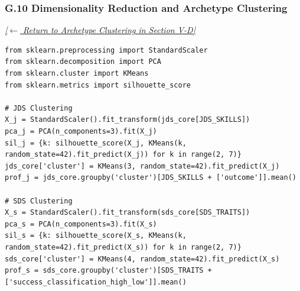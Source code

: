 \documentclass[conference]{IEEEtran}
\begin{document}
\subsubsection*{G.10 Dimensionality Reduction and Archetype Clustering}
\label{lst:clustering}
\textit{\hyperref[sec:multivariate]{[$\leftarrow$ Return to Archetype Clustering in Section V-D]}}

\begin{lstlisting}[style=pythonstyle,caption={PCA loadings, silhouette evaluation across k, and cluster centroid profiling.},label={lst:clustering_code}]
from sklearn.preprocessing import StandardScaler
from sklearn.decomposition import PCA
from sklearn.cluster import KMeans
from sklearn.metrics import silhouette_score

# JDS Clustering
X_j = StandardScaler().fit_transform(jds_core[JDS_SKILLS])
pca_j = PCA(n_components=3).fit(X_j)
sil_j = {k: silhouette_score(X_j, KMeans(k, random_state=42).fit_predict(X_j)) for k in range(2, 7)}
jds_core['cluster'] = KMeans(3, random_state=42).fit_predict(X_j)
prof_j = jds_core.groupby('cluster')[JDS_SKILLS + ['outcome']].mean()

# SDS Clustering
X_s = StandardScaler().fit_transform(sds_core[SDS_TRAITS])
pca_s = PCA(n_components=3).fit(X_s)
sil_s = {k: silhouette_score(X_s, KMeans(k, random_state=42).fit_predict(X_s)) for k in range(2, 7)}
sds_core['cluster'] = KMeans(4, random_state=42).fit_predict(X_s)
prof_s = sds_core.groupby('cluster')[SDS_TRAITS + ['success_classification_high_low']].mean()
\end{lstlisting}
\end{document}
